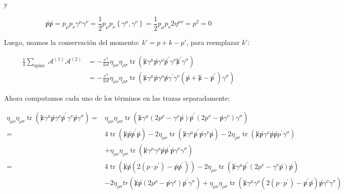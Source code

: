 y

\begin{equation}
  \not p \not p=p_\mu p_\nu \gamma^\mu \gamma^\nu=\frac{1}{2} p_\mu p_\nu\left\{\gamma^\mu, \gamma^\nu\right\}=\frac{1}{2} p_\mu p_\nu 2 \eta^{\mu \nu}=p^2=0
\end{equation}

Luego, usamos la conservación del momento: $ k' = p + k - p' $, para reemplazar $ k' $:

\begin{equation}
  \begin{aligned}
  \frac{1}{4} \sum_{\text {spins }} \mathcal{A}^{(1)} \mathcal{A}^{(2)} & =-\frac{e^4}{4 s t} \eta_{\mu \nu} \eta_{\rho \sigma} \operatorname{tr}\left(\not k \gamma^\mu \not p \gamma^\rho \not p^{\prime} \gamma^\nu \not k^{\prime} \gamma^\sigma\right) \\
  & =-\frac{e^4}{4 s t} \eta_{\mu \nu} \eta_{\rho \sigma} \operatorname{tr}\left(\not k \gamma^\mu \not p \gamma^\rho \not p \gamma^{\prime} \gamma^\nu\left(\not p+\not k-\not p^{\prime}\right) \gamma^\sigma\right)
  \end{aligned}
  \end{equation}

Ahora computamos cada uno de los términos en las trazas separadamente:

\begin{equation}
  \begin{aligned}
  \eta_{\mu \nu} \eta_{\rho \sigma} \operatorname{tr}\left(\not k \gamma^\mu \not p \gamma^\rho \not p^{\prime} \gamma^\nu \not p \gamma^\sigma\right)= & \eta_{\mu \nu} \eta_{\rho \sigma} \operatorname{tr}\left(\not k \gamma^\mu\left(2 p^\rho-\gamma^\rho \not p\right) \not p^{\prime}\left(2 p^\nu-\not p \gamma^\nu\right) \gamma^\sigma\right) \\
  = & 4 \operatorname{tr}\left(\not k \not p \not p^{\prime} \not p\right)-2 \eta_{\mu \nu} \operatorname{tr}\left(\not k \gamma^\mu \not p^{\prime} \not p \gamma^\nu \not p\right)-2 \eta_{\rho \sigma} \operatorname{tr}\left(\not k \not p \gamma^\rho \not p \not p p^{\prime} \gamma^\sigma\right) \\
  & +\eta_{\mu \nu} \eta_{\rho \sigma} \operatorname{tr}\left(\not k \gamma^\mu \gamma^\rho \not p \not p^{\prime} \not p \gamma^\nu \gamma^\sigma\right) \\
  = & 4 \operatorname{tr}\left(\not k \not p\left(2\left(p \cdot p^{\prime}\right)-\not p \not p^{\prime}\right)\right)-2 \eta_{\mu \nu} \operatorname{tr}\left(\not k \gamma^\mu \not p^{\prime}\left(2 p^\nu-\gamma^\nu \not p\right) \not p\right) \\
  & -2 \eta_{\rho \sigma} t r\left(\not k \not p\left(2 p^\rho-\not p \gamma^\rho\right) \not p^{\prime} \gamma^\sigma\right)+\eta_{\mu \nu} \eta_{\rho \sigma} \operatorname{tr}\left(\not k \gamma^\mu \gamma^\rho\left(2\left(p \cdot p^{\prime}\right)-\not p^\prime \not p\right) \not p \gamma^\nu \gamma^\sigma\right)
  \end{aligned}
  \end{equation}

